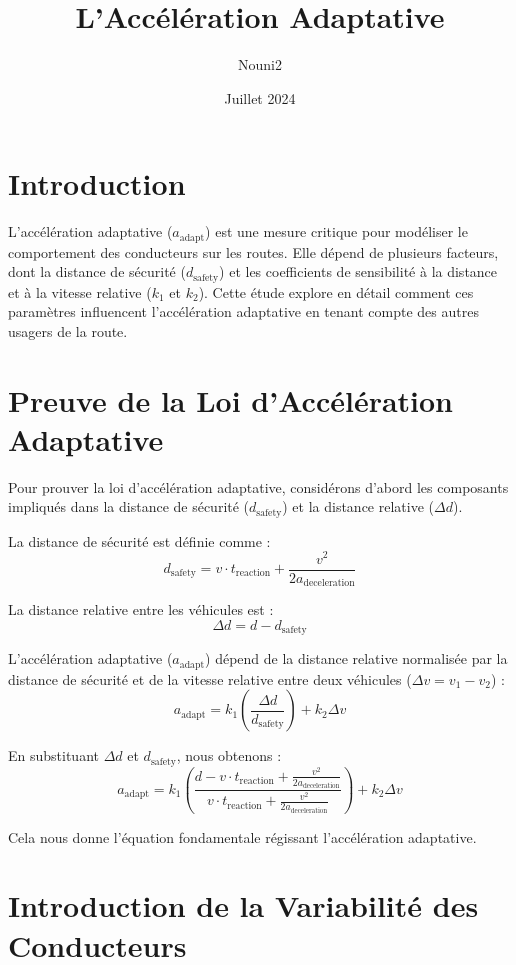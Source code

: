\documentclass{article}
\title{L'Accélération Adaptative}
\author{Nouni2}
\date{Juillet 2024}
\begin{document}
\maketitle

\section{Introduction}

L'accélération adaptative (\(a_{\text{adapt}}\)) est une mesure critique pour modéliser le comportement des conducteurs sur les routes. Elle dépend de plusieurs facteurs, dont la distance de sécurité (\(d_{\text{safety}}\)) et les coefficients de sensibilité à la distance et à la vitesse relative (\(k_1\) et \(k_2\)). Cette étude explore en détail comment ces paramètres influencent l'accélération adaptative en tenant compte des autres usagers de la route.

\section{Preuve de la Loi d'Accélération Adaptative}

Pour prouver la loi d'accélération adaptative, considérons d'abord les composants impliqués dans la distance de sécurité (\(d_{\text{safety}}\)) et la distance relative (\(\Delta d\)).

La distance de sécurité est définie comme :
\[
d_{\text{safety}} = v \cdot t_{\text{reaction}} + \frac{v^2}{2a_{\text{deceleration}}}
\]

La distance relative entre les véhicules est :
\[
\Delta d = d - d_{\text{safety}}
\]

L'accélération adaptative (\(a_{\text{adapt}}\)) dépend de la distance relative normalisée par la distance de sécurité et de la vitesse relative entre deux véhicules (\(\Delta v = v_1 - v_2\)) :
\[
a_{\text{adapt}} = k_1 \left( \frac{\Delta d}{d_{\text{safety}}} \right) + k_2 \Delta v
\]

En substituant \(\Delta d\) et \(d_{\text{safety}}\), nous obtenons :
\[
a_{\text{adapt}} = k_1 \left( \frac{d -  v \cdot t_{\text{reaction}} + \frac{v^2}{2a_{\text{deceleration}}} }{v \cdot t_{\text{reaction}} + \frac{v^2}{2a_{\text{deceleration}}}} \right) + k_2 \Delta v
\]

Cela nous donne l'équation fondamentale régissant l'accélération adaptative.


\section{Introduction de la Variabilité des Conducteurs}
\end{document}
